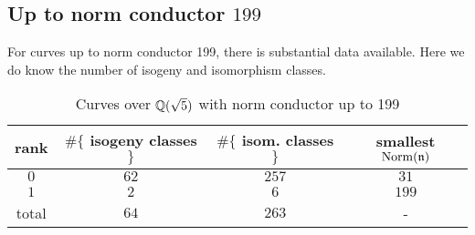 \documentclass{amsart}
\newcommand{\n}{\mathfrak{n}}
\begin{document}
\vspace{10mm}




\subsection{Up to norm conductor  $199$}\label{sec:to199}

For curves up to norm conductor 199, 
there is substantial data available.
Here we do know the number of isogeny and isomorphism classes.

\begin{center}
\begin{table}[h]
\caption{Curves over $\mathbb{Q}(\sqrt{5})$ with norm conductor up to 199\label{table:rank-counts}}
\begin{tabular}{|c|c|c|c|}\hline
{\bf rank} & $\#\{$ {\bf isogeny classes }$\}$ &  $\#\{$ {\bf isom. classes }$\}$ &{\bf smallest $\Norm(\n)$}\\\hline
 $0$ & $62$ & $257$ & $31$\\\hline
 $1$ & $2$ & $6$ & $199$\\\hline
total & $64$ & $263$ & - \\\hline
\end{tabular}
\end{table}
\end{center}

\end{document}
